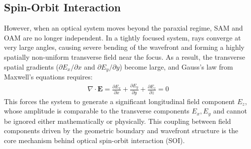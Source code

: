 \subsection{Spin-Orbit Interaction}

However, when an optical system moves beyond the paraxial regime, SAM and OAM are no longer independent. In a tightly focused system, rays converge at very large angles, causing severe bending of the wavefront and forming a highly spatially non-uniform transverse field near the focus. As a result, the transverse spatial gradients ($\partial E_x/\partial x$ and $\partial E_y/\partial y$) become large, and Gauss's law from Maxwell's equations requires:
\begin{align}
\nabla \cdot \mathbf{E} = \frac{\partial E_x}{\partial x} + \frac{\partial E_y}{\partial y} + \frac{\partial E_z}{\partial z} = 0
\end{align}
This forces the system to generate a significant longitudinal field component $E_z$, whose amplitude is comparable to the transverse components $E_x, E_y$ and cannot be ignored either mathematically or physically. This coupling between field components driven by the geometric boundary and wavefront structure is the core mechanism behind optical spin-orbit interaction (SOI).

